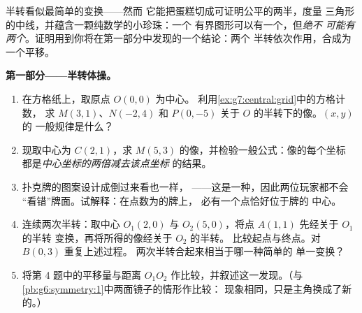 \begin{problem}
\label{pb:g7:central:1}
半转看似最简单的变换——然而
它能把蛋糕切成可证明公平的两半，度量
三角形的中线，并蕴含一颗纯数学的小珍珠：一个
有界图形可以有一个，但\emph{绝不
可能有两个}。证明用到你将在第一部分中发现的一个结论：两个
半转依次作用，合成为一个平移。

\medskip
\noindent\textbf{第一部分——半转体操。}
\begin{enumerate}
  \item 在方格纸上，取原点 $O(0, 0)$ 为中心。
        利用\cref{ex:g7:central:grid}中的方格计数，
        求 $M(3, 1)$、$N(-2, 4)$ 和
        $P(0, -5)$ 关于 $O$ 的半转下的像。$(x, y)$ 的
        一般规律是什么？
  \item 现取中心为 $C(2, 1)$，求
        $M(5, 3)$ 的像，并检验一般公式：像的每个坐标
        都是\emph{中心坐标的两倍减去该点坐标}
        的结果。
  \item 扑克牌的图案设计成倒过来看也一样，
        ——这是一种，因此两位玩家都不会
        “看错”牌面。试解释：在点数为\emph{}的牌上，
        必有一个点恰好位于牌的
        中心。
  \item 连续两次半转：取中心 $O_1(2, 0)$
        与 $O_2(5, 0)$，将点 $A(1, 1)$ 先经关于 $O_1$ 的半转
        变换，再将所得的像经关于 $O_2$ 的半转。
        比较起点与终点。对 $B(0, 3)$ 重复上述过程。
        两次半转合起来相当于哪一种简单的
        单一变换？
  \item 将第 4 题中的平移量与距离
        $O_1 O_2$ 作比较，并叙述这一发现。（与
        \cref{pb:g6:symmetry:1}中两面镜子的情形作比较：
        现象相同，只是主角换成了新的。）
\end{enumerate}


\end{problem}
